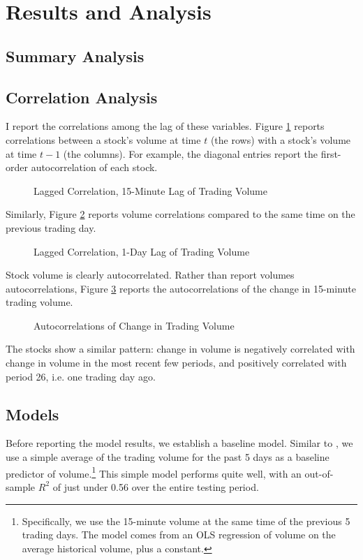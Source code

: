 \documentclass[12pt]{article}
\begin{document}
\section{Results and Analysis}
\subsection{Summary Analysis}
\subsection{Correlation Analysis}
I report the correlations among the lag of these variables. Figure \ref{fig:lagged_volume} reports correlations between a stock's volume at time $t$ (the rows) with a stock's volume at time $t-1$ (the columns). For example, the diagonal entries report the first-order autocorrelation of each stock.

\begin{figure}[H]
    \centering
    \caption{Lagged Correlation, 15-Minute Lag of Trading Volume}
    \label{fig:lagged_volume}
\end{figure}

Similarly, Figure \ref{fig:lagged_volume_day} reports volume correlations compared to the same time on the previous trading day.

\begin{figure}[H]
    \centering
    \caption{Lagged Correlation, 1-Day Lag of Trading Volume}
    \label{fig:lagged_volume_day}
\end{figure}

Stock volume is clearly autocorrelated. Rather than report volumes autocorrelations, Figure \ref{fig:autocorrelations} reports the autocorrelations of the change in 15-minute trading volume. 

\begin{figure}[H]
    \centering
    \caption{Autocorrelations of Change in Trading Volume}
    \label{fig:autocorrelations}
\end{figure}

The stocks show a similar pattern: change in volume is negatively correlated with change in volume in the most recent few periods, and positively correlated with period 26, i.e. one trading day ago.

\subsection{Models}
Before reporting the model results, we establish a baseline model. Similar to \textcite{goyenko2024trading}, we use a simple average of the trading volume for the past 5 days as a baseline predictor of volume.\footnote{Specifically, we use the 15-minute volume at the same time of the previous 5 trading days. The model comes from an OLS regression of volume on the average historical volume, plus a constant.} This simple model performs quite well, with an out-of-sample $R^2$ of just under 0.56 over the entire testing period.
\end{document}
